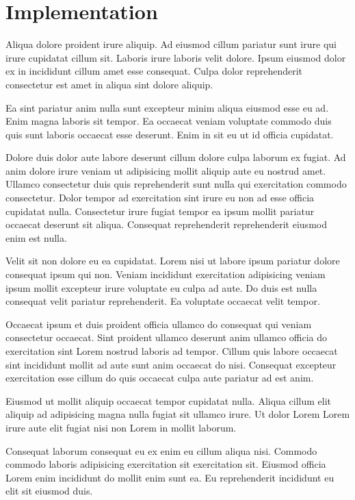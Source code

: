 \section{Implementation}
Aliqua dolore proident irure aliquip. Ad eiusmod cillum pariatur sunt irure qui irure cupidatat cillum sit. Laboris irure laboris velit dolore. Ipsum eiusmod dolor ex in incididunt cillum amet esse consequat. Culpa dolor reprehenderit consectetur est amet in aliqua sint dolore aliquip.

Ea sint pariatur anim nulla sunt excepteur minim aliqua eiusmod esse eu ad. Enim magna laboris sit tempor. Ea occaecat veniam voluptate commodo duis quis sunt laboris occaecat esse deserunt. Enim in sit eu ut id officia cupidatat.

Dolore duis dolor aute labore deserunt cillum dolore culpa laborum ex fugiat. Ad anim dolore irure veniam ut adipisicing mollit aliquip aute eu nostrud amet. Ullamco consectetur duis quis reprehenderit sunt nulla qui exercitation commodo consectetur. Dolor tempor ad exercitation sint irure eu non ad esse officia cupidatat nulla. Consectetur irure fugiat tempor ea ipsum mollit pariatur occaecat deserunt sit aliqua. Consequat reprehenderit reprehenderit eiusmod enim est nulla.

Velit sit non dolore eu ea cupidatat. Lorem nisi ut labore ipsum pariatur dolore consequat ipsum qui non. Veniam incididunt exercitation adipisicing veniam ipsum mollit excepteur irure voluptate eu culpa ad aute. Do duis est nulla consequat velit pariatur reprehenderit. Ea voluptate occaecat velit tempor.

Occaecat ipsum et duis proident officia ullamco do consequat qui veniam consectetur occaecat. Sint proident ullamco deserunt anim ullamco officia do exercitation sint Lorem nostrud laboris ad tempor. Cillum quis labore occaecat sint incididunt mollit ad aute sunt anim occaecat do nisi. Consequat excepteur exercitation esse cillum do quis occaecat culpa aute pariatur ad est anim.

Eiusmod ut mollit aliquip occaecat tempor cupidatat nulla. Aliqua cillum elit aliquip ad adipisicing magna nulla fugiat sit ullamco irure. Ut dolor Lorem Lorem irure aute elit fugiat nisi non Lorem in mollit laborum.

Consequat laborum consequat eu ex enim eu cillum aliqua nisi. Commodo commodo laboris adipisicing exercitation sit exercitation sit. Eiusmod officia Lorem enim incididunt do mollit enim sunt ea. Eu reprehenderit incididunt eu elit sit eiusmod duis.

